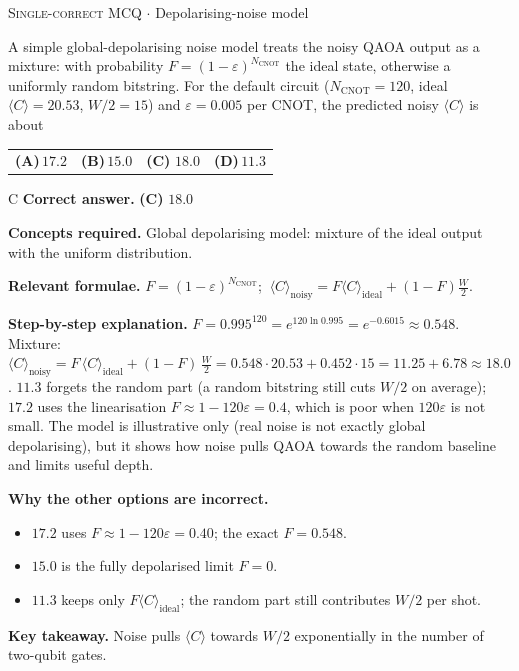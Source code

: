 \documentclass[11pt,a4paper]{article}
\newcommand{\optlabel}[1]{\textbf{(#1)}}
\newcommand{\correctlabel}[1]{\textcolor{okgreen}{\textbf{(#1)}\,\ding{51}}}
\newenvironment{qitem}[1]{\begin{list}{}{\setlength{\leftmargin}{3.3em}\setlength{\labelwidth}{3.1em}%
  \setlength{\labelsep}{0.2em}\setlength{\topsep}{3pt}\setlength{\parsep}{3pt}}\item[\textbf{Q.#1}\hfill]}{\end{list}}
\newcommand{\qsep}{\par\vspace{2pt}{\color{black!15}\hrule}\vspace{4pt}}
\newcommand{\qmeta}[2]{{\footnotesize\color{black!60}\textsc{#1} \;$\cdot$\; #2}\par}
\begin{document}
\begin{qitem}{71}
\qmeta{Single-correct MCQ}{Depolarising-noise model}
A simple global-depolarising noise model treats the noisy QAOA output as a mixture: with probability $F = (1 - \varepsilon)^{N_{\text{CNOT}}}$
the ideal state, otherwise a uniformly random bitstring. For the default circuit ($N_{\text{CNOT}} = 120$, ideal $\langle C\rangle = 20.53$,
$W/2 = 15$) and $\varepsilon = 0.005$ per CNOT, the predicted noisy $\langle C\rangle$ is about
\par\smallskip\noindent\begin{tabularx}{\linewidth}{@{}*{4}{L}@{}}
\optlabel{A}\,$17.2$ & \optlabel{B}\,$15.0$ & \correctlabel{C}\,$18.0$ & \optlabel{D}\,$11.3$
\end{tabularx}
\end{qitem}
\begin{solbox}{C}
\textbf{\color{brand}Correct answer.} \textcolor{okgreen}{\textbf{(C)}} $18.0$

\textbf{\color{brand}Concepts required.} Global depolarising model: mixture of the ideal output with the uniform distribution.

\textbf{\color{brand}Relevant formulae.} $F = (1-\varepsilon)^{N_{\text{CNOT}}}$; $\ \langle C\rangle_{\text{noisy}} = F\langle C\rangle_{\text{ideal}} + (1 - F)\tfrac W2$.

\textbf{\color{brand}Step-by-step explanation.} $F = 0.995^{120} = e^{120\ln0.995} = e^{-0.6015} \approx 0.548$.
Mixture: $\langle C\rangle_{\text{noisy}} = F\,\langle C\rangle_{\text{ideal}} + (1 - F)\,\tfrac W2 = 0.548\cdot20.53 + 0.452\cdot15 = 11.25 + 6.78 \approx 18.0$.
$11.3$ forgets the random part (a random bitstring still cuts $W/2$ on average); $17.2$ uses the linearisation
$F \approx 1 - 120\varepsilon = 0.4$, which is poor when $120\varepsilon$ is not small. The model is illustrative only (real noise is
not exactly global depolarising), but it shows how noise pulls QAOA towards the random baseline and limits useful depth.

\textbf{\color{brand}Why the other options are incorrect.}
\begin{itemize}[leftmargin=2.4em, itemsep=1pt, topsep=2pt]
\item[\textbf{(A)}] $17.2$ uses $F \approx 1 - 120\varepsilon = 0.40$; the exact $F = 0.548$.
\item[\textbf{(B)}] $15.0$ is the fully depolarised limit $F = 0$.
\item[\textbf{(D)}] $11.3$ keeps only $F\langle C\rangle_{\text{ideal}}$; the random part still contributes $W/2$ per shot.
\end{itemize}
\textbf{\color{brand}Key takeaway.} Noise pulls $\langle C\rangle$ towards $W/2$ exponentially in the number of two-qubit gates.
\end{solbox}
\qsep
\end{document}
